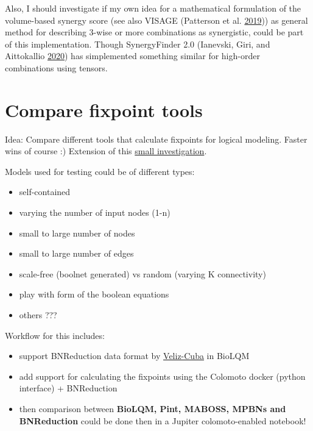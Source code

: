 \documentclass[
  12pt,
]{book}
\providecommand{\tightlist}{%
  \setlength{\itemsep}{0pt}\setlength{\parskip}{0pt}}
\begin{document}
Also, I should investigate if my own idea for a mathematical formulation of the volume-based synergy score (see also VISAGE (Patterson et al. \protect\hyperlink{ref-Patterson2019}{2019})) as general method for describing 3-wise or more combinations as synergistic, could be part of this implementation.
Though SynergyFinder 2.0 (Ianevski, Giri, and Aittokallio \protect\hyperlink{ref-Ianevski2020}{2020}) has simplemented something similar for high-order combinations using tensors.

\hypertarget{comp}{%
\section*{Compare fixpoint tools}\label{comp}}

Idea: Compare different tools that calculate fixpoints for logical modeling.
Faster wins of course :) Extension of this \protect\hyperlink{attrToolCmp}{small investigation}.

Models used for testing could be of different types:

\begin{itemize}
\tightlist
\item
  self-contained
\item
  varying the number of input nodes (1-n)
\item
  small to large number of nodes
\item
  small to large number of edges
\item
  scale-free (boolnet generated) vs random (varying K connectivity)
\item
  play with form of the boolean equations
\item
  others ???
\end{itemize}

Workflow for this includes:

\begin{itemize}
\tightlist
\item
  support BNReduction data format by \href{https://doi.org/10.1186/1471-2105-15-221}{Veliz-Cuba}
  in BioLQM
\item
  add support for calculating the fixpoints using the Colomoto docker (python
  interface) + BNReduction
\item
  then comparison between \textbf{BioLQM, Pint, MABOSS, MPBNs and BNReduction} could be done then
  in a Jupiter colomoto-enabled notebook!
\end{itemize}
\end{document}

